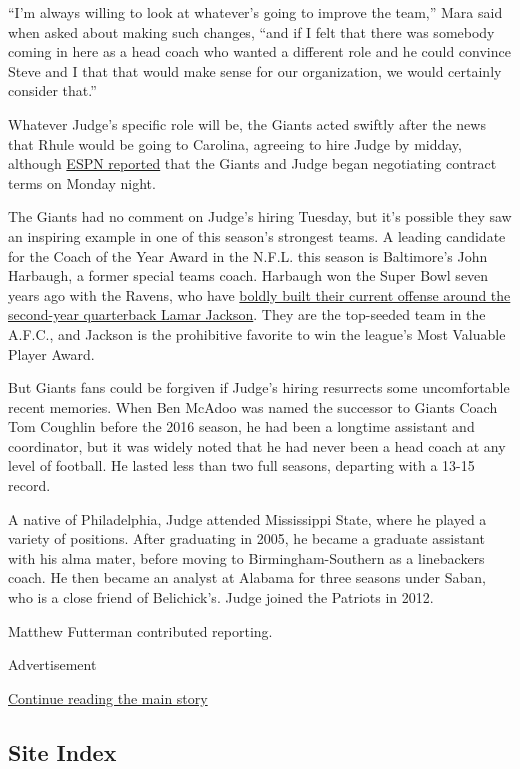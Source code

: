 ``I'm always willing to look at whatever's going to improve the team,''
Mara said when asked about making such changes, ``and if I felt that
there was somebody coming in here as a head coach who wanted a different
role and he could convince Steve and I that that would make sense for
our organization, we would certainly consider that.''

Whatever Judge's specific role will be, the Giants acted swiftly after
the news that Rhule would be going to Carolina, agreeing to hire Judge
by midday, although
\href{https://twitter.com/AdamSchefter/status/1214580737409781761}{ESPN
reported} that the Giants and Judge began negotiating contract terms on
Monday night.

The Giants had no comment on Judge's hiring Tuesday, but it's possible
they saw an inspiring example in one of this season's strongest teams. A
leading candidate for the Coach of the Year Award in the N.F.L. this
season is Baltimore's John Harbaugh, a former special teams coach.
Harbaugh won the Super Bowl seven years ago with the Ravens, who have
\href{https://www.nytimes3xbfgragh.onion/2019/10/10/sports/football/lamar-jackson-ravens.html}{boldly
built their current offense around the second-year quarterback Lamar
Jackson}. They are the top-seeded team in the A.F.C., and Jackson is the
prohibitive favorite to win the league's Most Valuable Player Award.

But Giants fans could be forgiven if Judge's hiring resurrects some
uncomfortable recent memories. When Ben McAdoo was named the successor
to Giants Coach Tom Coughlin before the 2016 season, he had been a
longtime assistant and coordinator, but it was widely noted that he had
never been a head coach at any level of football. He lasted less than
two full seasons, departing with a 13-15 record.

A native of Philadelphia, Judge attended Mississippi State, where he
played a variety of positions. After graduating in 2005, he became a
graduate assistant with his alma mater, before moving to
Birmingham-Southern as a linebackers coach. He then became an analyst at
Alabama for three seasons under Saban, who is a close friend of
Belichick's. Judge joined the Patriots in 2012.

Matthew Futterman contributed reporting.

Advertisement

\protect\hyperlink{after-bottom}{Continue reading the main story}

\hypertarget{site-index}{%
\subsection{Site Index}\label{site-index}}

